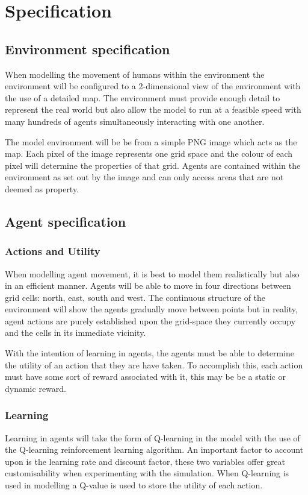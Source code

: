 \documentclass[11pt]{informatics-report}
\begin{document}
\section{Specification}
\subsection{Environment specification}
When modelling the movement of humans within the environment the environment will be configured to a 2-dimensional view of the environment with the use of a detailed map. The environment must provide enough detail to represent the real world but also allow the model to run at a feasible speed with many hundreds of agents simultaneously interacting with one another. \par

The model environment will be be from a simple PNG image which acts as the map. Each pixel of the image represents one grid space and the colour of each pixel will determine the properties of that grid. Agents are contained within the environment as set out by the image and can only access areas that are not deemed as property.

\subsection{Agent specification}
\subsubsection{Actions and Utility}
When modelling agent movement, it is best to model them realistically but also in an efficient manner. Agents will be able to move in four directions between grid cells: north, east, south and west. The continuous structure of the environment will show the agents gradually move between points but in reality, agent actions are purely established upon the grid-space they currently occupy and the cells in its immediate vicinity. \par

With the intention of learning in agents, the agents must be able to determine the utility of an action that they are have taken. To accomplish this, each action must have some sort of reward associated with it, this may be be a static or dynamic reward. 

\subsubsection{Learning}
Learning in agents will take the form of Q-learning in the model with the use of the Q-learning reinforcement learning algorithm. An important factor to account upon is the learning rate and discount factor, these two variables offer great customisability when experimenting with the simulation. When Q-learning is used in modelling a Q-value is used to store the utility of each action. \par
\end{document}
